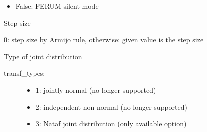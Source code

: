 \documentclass[letterpaper,10pt,english]{sphinxmanual}
\begin{document}
\begin{fulllineitems}
\begin{fulllineitems}
\begin{itemize}
\item {} 
False: FERUM silent mode

\end{itemize}

\end{fulllineitems}


\begin{fulllineitems}
\label{model:pyre.model.AnalysisOptions.step_size}
Step size

0: step size by Armijo rule, otherwise: given value is the step size

\end{fulllineitems}


\begin{fulllineitems}
\label{model:pyre.model.AnalysisOptions.transf_type}
Type of joint distribution
\begin{description}
\item[{transf\_types:}] \leavevmode\begin{itemize}
\item {} 
1: jointly normal (no longer supported)

\item {} 
2: independent non-normal (no longer supported)

\item {} 
3: Nataf joint distribution (only available option)

\end{itemize}

\end{description}

\end{fulllineitems}


\end{fulllineitems}

\end{document}

